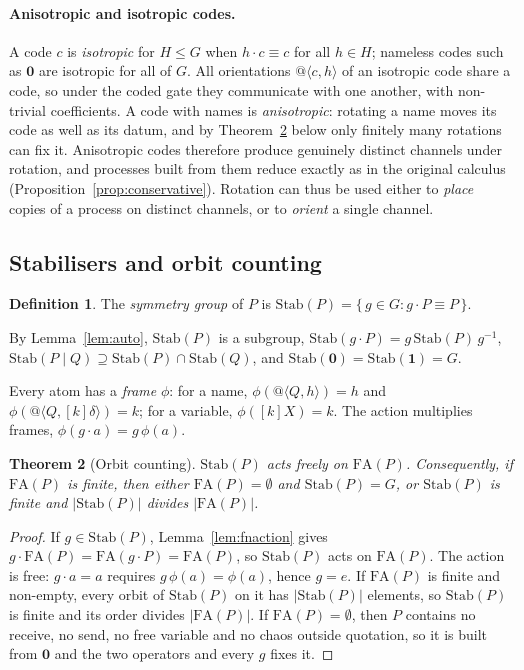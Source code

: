 \documentclass[11pt]{article}
\makeatletter
\newtheorem{theorem}{Theorem}[section]
\theoremstyle{definition}
\newtheorem{definition}[theorem]{Definition}
\theoremstyle{remark}
\newcommand{\nil}{\mathbf{0}}
\newcommand{\chaos}{\mathbf{1}}
\newcommand{\qn}[2]{@\langle #1, #2\rangle}
\newcommand{\act}[2]{#1\cdot #2}
\newcommand{\scong}{\equiv}
\newcommand{\Stab}{\mathrm{Stab}}
\newcommand{\fr}[2]{[#1]#2}
\newcommand{\FA}{\mathrm{FA}}
\makeatother
\begin{document}
\paragraph{Anisotropic and isotropic codes.}
A code $c$ is \emph{isotropic} for $H\le G$ when $\act{h}{c}\scong c$ for all
$h\in H$; nameless codes such as $\nil$ are isotropic for all of $G$. All
orientations $\qn{c}{h}$ of an isotropic code share a code, so under the coded
gate they communicate with one another, with non-trivial coefficients. A code
with names is \emph{anisotropic}: rotating a name moves its code as well as
its datum, and by Theorem~\ref{thm:counting} below only finitely many rotations
can fix it. Anisotropic codes therefore produce genuinely distinct channels
under rotation, and processes built from them reduce exactly as in the
original calculus (Proposition~\ref{prop:conservative}). Rotation can thus be
used either to \emph{place} copies of a process on distinct channels, or to
\emph{orient} a single channel.

\subsection{Stabilisers and orbit counting}

\begin{definition}
The \emph{symmetry group} of $P$ is
$\Stab(P)=\{\,g\in G : \act{g}{P}\scong P\,\}$.
\end{definition}

By Lemma~\ref{lem:auto}, $\Stab(P)$ is a subgroup,
$\Stab(\act{g}{P})=g\,\Stab(P)\,g^{-1}$,
$\Stab(P\mid Q)\supseteq\Stab(P)\cap\Stab(Q)$, and
$\Stab(\nil)=\Stab(\chaos)=G$.

Every atom has a \emph{frame} $\phi$: for a name, $\phi(\qn{Q}{h})=h$ and
$\phi(\qn{Q}{\fr{k}{\delta}})=k$; for a variable, $\phi(\fr{k}{X})=k$. The
action multiplies frames, $\phi(\act{g}{a})=g\,\phi(a)$.

\begin{theorem}[Orbit counting]\label{thm:counting}
$\Stab(P)$ acts freely on $\FA(P)$. Consequently, if $\FA(P)$ is finite, then
either $\FA(P)=\emptyset$ and $\Stab(P)=G$, or $\Stab(P)$ is finite and
$|\Stab(P)|$ divides $|\FA(P)|$.
\end{theorem}

\begin{proof}
If $g\in\Stab(P)$, Lemma~\ref{lem:fnaction} gives
$\act{g}{\FA(P)}=\FA(\act{g}{P})=\FA(P)$, so $\Stab(P)$ acts on $\FA(P)$. The
action is free: $\act{g}{a}=a$ requires $g\,\phi(a)=\phi(a)$, hence $g=e$.
If $\FA(P)$ is finite and non-empty, every orbit of $\Stab(P)$ on it has
$|\Stab(P)|$ elements, so $\Stab(P)$ is finite and its order divides
$|\FA(P)|$. If $\FA(P)=\emptyset$, then $P$ contains no receive, no send, no
free variable and no chaos outside quotation, so it is built from $\nil$ and
the two operators and every $g$ fixes it.
\end{proof}
\end{document}
